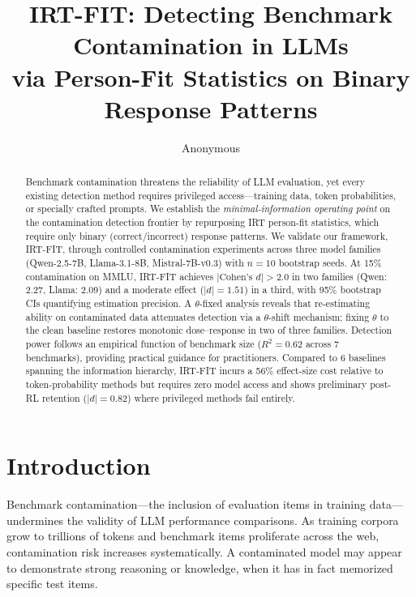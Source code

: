 \documentclass[11pt,a4paper]{article}
\title{IRT-FIT: Detecting Benchmark Contamination in LLMs\\via Person-Fit Statistics on Binary Response Patterns}
\author{Anonymous}
\date{}
\begin{document}
\maketitle

\begin{abstract}
Benchmark contamination threatens the reliability of LLM evaluation, yet every existing detection method requires privileged access---training data, token probabilities, or specially crafted prompts.
We establish the \emph{minimal-information operating point} on the contamination detection frontier by repurposing IRT person-fit statistics, which require only binary (correct/incorrect) response patterns.
We validate our framework, \textsc{IRT-FIT}, through controlled contamination experiments across three model families (Qwen-2.5-7B, Llama-3.1-8B, Mistral-7B-v0.3) with $n{=}10$ bootstrap seeds.
At 15\% contamination on MMLU, \textsc{IRT-FIT} achieves $|\text{Cohen's } d|{>}2.0$ in two families (Qwen: 2.27, Llama: 2.09) and a moderate effect ($|d|{=}1.51$) in a third, with 95\% bootstrap CIs quantifying estimation precision.
A $\theta$-fixed analysis reveals that re-estimating ability on contaminated data attenuates detection via a $\theta$-shift mechanism; fixing $\theta$ to the clean baseline restores monotonic dose--response in two of three families.
Detection power follows an empirical function of benchmark size ($R^2{=}0.62$ across 7 benchmarks), providing practical guidance for practitioners.
Compared to 6 baselines spanning the information hierarchy, \textsc{IRT-FIT} incurs a 56\% effect-size cost relative to token-probability methods but requires zero model access and shows preliminary post-RL retention ($|d|{=}0.82$) where privileged methods fail entirely.
\end{abstract}

\section{Introduction}
\label{sec:intro}

Benchmark contamination---the inclusion of evaluation items in training data---undermines the validity of LLM performance comparisons.
As training corpora grow to trillions of tokens and benchmark items proliferate across the web, contamination risk increases systematically.
A contaminated model may appear to demonstrate strong reasoning or knowledge, when it has in fact memorized specific test items.
\end{document}
